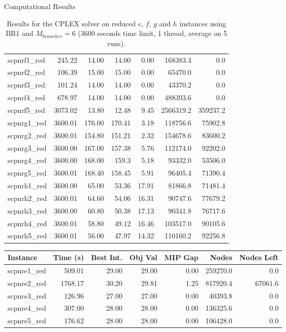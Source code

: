 \documentclass[a4paper,12pt]{mydeitesi_eng}
\begin{document}
\begin{chapter}{Computational Results}
\begin{table}[h]
\begin{center}
\begin{tabular}{l|r|r|r|r|r|r}
scpnrf1\_red & 245.22 & 14.00 & 14.00 & 0.00 & 168383.4 & 0.0\\ 
scpnrf2\_red & 106.39 & 15.00 & 15.00 & 0.00 & 65470.0 & 0.0\\ 
scpnrf3\_red & 101.24 & 14.00 & 14.00 & 0.00 & 43370.2 & 0.0\\ 
scpnrf4\_red & 678.97 & 14.00 & 14.00 & 0.00 & 488393.6 & 0.0\\ 
scpnrf5\_red & 3073.02 & 13.80 & 12.48 & 9.45 & 2566319.2 & 359237.2\\
\hline
 
scpnrg1\_red & 3600.01 & 176.00 & 170.41 & 3.18 & 118756.6 & 75902.8\\ 
scpnrg2\_red & 3600.01 & 154.80 & 151.21 & 2.32 & 154678.6 & 83600.2\\ 
scpnrg3\_red & 3600.00 & 167.00 & 157.38 & 5.76 & 112174.0 & 92202.0\\ 
scpnrg4\_red & 3600.00 & 168.00 & 159.3 & 5.18 & 93332.0 & 53506.0\\ 
scpnrg5\_red & 3600.01 & 168.40 & 158.45 & 5.91 & 96405.4 & 71390.4\\
\hline
 
scpnrh1\_red & 3600.00 & 65.00 & 53.36 & 17.91 & 81866.8 & 71481.4\\ 
scpnrh2\_red & 3600.01 & 64.60 & 54.06 & 16.31 & 90747.6 & 77679.2\\ 
scpnrh3\_red & 3600.00 & 60.80 & 50.38 & 17.13 & 90341.8 & 76717.6\\ 
scpnrh4\_red & 3600.01 & 58.80 & 49.12 & 16.46 & 103517.0 & 90105.6\\ 
scpnrh5\_red & 3600.01 & 56.00 & 47.97 & 14.32 & 110160.2 & 92256.8\\ 

\end{tabular}
\end{center}
\caption{Results for the CPLEX solver on reduced $e$, $f$, $g$ and $h$ instances using BR1 and $M_{branches} = 6$ (3600 seconds time limit, 1 thread, average on 5  runs).}
\label{tab:ResultBR1_M6}
\end{table}


\begin{table}[h]
\begin{center}
\begin{tabular}{l|r|r|r|r|r|r}
\textbf{Instance} & \textbf{Time (s)} & \textbf{Best Int.} & \textbf{Obj Val} & \textbf{MIP Gap} & \textbf{Nodes} & \textbf{Nodes Left}\\
\hline
scpnre1\_red & 509.01 & 29.00 & 29.00 & 0.00 & 259270.0 & 0.0\\ 
scpnre2\_red & 1768.17 & 30.20 & 29.81 & 1.25 & 817920.4 & 67061.6\\ 
scpnre3\_red & 126.96 & 27.00 & 27.00 & 0.00 & 40393.8 & 0.0\\ 
scpnre4\_red & 307.00 & 28.00 & 28.00 & 0.00 & 136325.6 & 0.0\\ 
scpnre5\_red & 176.62 & 28.00 & 28.00 & 0.00 & 106428.0 & 0.0\\
\hline
 

\end{tabular}
\end{center}
\end{table}
\end{chapter}
\end{document}

